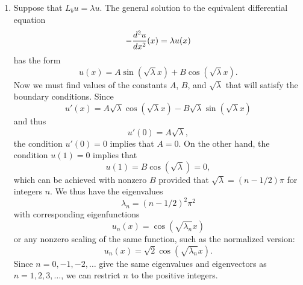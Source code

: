 {\begin{solution}
\begin{enumerate}
         
          This statement implies that all eigenvalues are non-negative, since
           \[ \lambda (u, u) = (\lambda u, u) = (L_b u, u) \ge 0,\]
          and we know that $(u,u)>0$ for all nonzero $u$ due to the positivity
          of the inner product. 

          One can show that $u'(x) \ne 0$ for some $x\in[0,1]$: otherwise
          $u$ would be a constant, and the only constant that satisfies the boundary
          conditions is $u(x)=0$, which is prohibited from consideration in the problem
          statement.  Thus, we can say $(L_b u, u) > 0$ for all nonzero $u$.

\item   Suppose that $L_b u = \lambda u$.  The general solution to the equivalent
        differential equation
                   \[  -{d^2 u\over dx^2} (x) = \lambda u(x)\]
        has the form
                   \[ u(x) = A \sin(\sqrt{\lambda} x) + B \cos(\sqrt{\lambda}x).\]
        Now we must find values of the constants $A$, $B$, and $\sqrt{\lambda}$
        that will satisfy the boundary conditions.  Since
                    \[ u'(x) = A\sqrt{\lambda} \cos(\sqrt{\lambda}x)
                               - B \sqrt{\lambda} \sin(\sqrt{\lambda}x)\]
        and thus
                    \[ u'(0) = A \sqrt{\lambda},\]
        the condition $u'(0) = 0$ implies that $A=0$.
        On the other hand, the condition $u(1) = 0$ implies that
                    \[ u(1) = B \cos(\sqrt{\lambda}) = 0,\]
        which can be achieved with nonzero $B$ provided that 
        $\sqrt{\lambda} = (n-1/2)\pi$ for integers $n$.
        We thus have the eigenvalues
                    \[ \lambda_n = (n-1/2)^2 \pi^2\]
        with corresponding eigenfunctions
                    \[ u_n(x) = \cos(\sqrt{\lambda_n} x)\]
        or any nonzero scaling of the same function, such as the normalized version:
                    \[ u_n(x) = \sqrt{2} \cos(\sqrt{\lambda_n} x).\]
        Since $n = 0, -1, -2, \ldots$ give the same eigenvalues and eigenvectors
        as $n = 1, 2, 3, \ldots$, we can restrict $n$ to the positive integers.
\end{enumerate}
\end{solution}}{}


